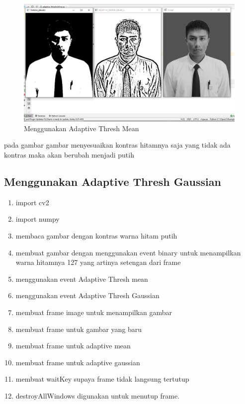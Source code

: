 \newpage
\begin{figure}[ht]
\centering
\includegraphics[scale=0.5]{figures/2,44.jpg}
\caption{Menggunakan Adaptive Thresh Mean}
\label{contoh}
\end{figure}
pada gambar gambar menyesuaikan kontras hitamnya saja yang tidak ada kontras maka akan berubah menjadi putih







\newpage
\subsection{Menggunakan Adaptive Thresh Gaussian}

\begin{enumerate}
	\item import cv2
	\item import numpy
	\item membaca gambar dengan kontras warna hitam putih
	\item membuat gambar dengan menggunakan event binary untuk menampilkan warna hitamnya 127 yang artinya setengan dari frame
	\item menggunakan event Adaptive Thresh mean
	\item menggunakan event Adaptive Thresh Gaussian
	\item membuat frame image untuk menampilkan gambar
	\item membuat frame untuk gambar yang baru
	\item membuat frame untuk adaptive mean
	\item membuat frame untuk adaptive gaussian
	\item membuat waitKey supaya frame tidak langsung tertutup
	\item destroyAllWindows digunakan untuk menutup frame.
\end{enumerate}

